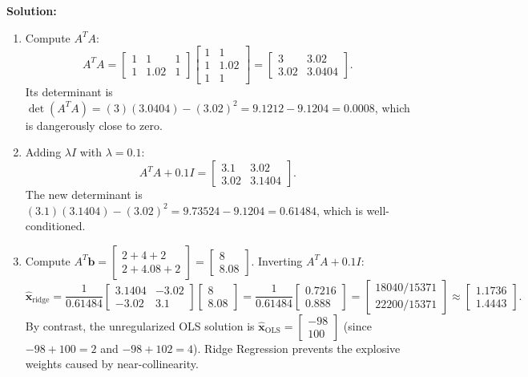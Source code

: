 \documentclass[11pt, letterpaper]{article}
\theoremstyle{definition}
\theoremstyle{remark}
\begin{document}
\textbf{Solution:}
\begin{enumerate}[label=(\alph*)]
    \item Compute $A^T A$:
    \[
    A^T A = \begin{bmatrix} 1 & 1 & 1 \\ 1 & 1.02 & 1 \end{bmatrix} \begin{bmatrix} 1 & 1 \\ 1 & 1.02 \\ 1 & 1 \end{bmatrix} = \begin{bmatrix} 3 & 3.02 \\ 3.02 & 3.0404 \end{bmatrix}.
    \]
    Its determinant is $\det(A^T A) = (3)(3.0404) - (3.02)^2 = 9.1212 - 9.1204 = 0.0008$, which is dangerously close to zero.
    \item Adding $\lambda I$ with $\lambda = 0.1$:
    \[
    A^T A + 0.1 I = \begin{bmatrix} 3.1 & 3.02 \\ 3.02 & 3.1404 \end{bmatrix}.
    \]
    The new determinant is $(3.1)(3.1404) - (3.02)^2 = 9.73524 - 9.1204 = 0.61484$, which is well-conditioned.
    \item Compute $A^T \mathbf{b} = \begin{bmatrix} 2+4+2 \\ 2+4.08+2 \end{bmatrix} = \begin{bmatrix} 8 \\ 8.08 \end{bmatrix}$. Inverting $A^T A + 0.1I$:
    \[
    \hat{\mathbf{x}}_{\text{ridge}} = \frac{1}{0.61484} \begin{bmatrix} 3.1404 & -3.02 \\ -3.02 & 3.1 \end{bmatrix} \begin{bmatrix} 8 \\ 8.08 \end{bmatrix} = \frac{1}{0.61484} \begin{bmatrix} 0.7216 \\ 0.888 \end{bmatrix} = \begin{bmatrix} 18040/15371 \\ 22200/15371 \end{bmatrix} \approx \begin{bmatrix} 1.1736 \\ 1.4443 \end{bmatrix}.
    \]
    By contrast, the unregularized OLS solution is $\hat{\mathbf{x}}_{\text{OLS}} = \begin{bmatrix} -98 \\ 100 \end{bmatrix}$ (since $-98 + 100 = 2$ and $-98 + 102 = 4$). Ridge Regression prevents the explosive weights caused by near-collinearity.
\end{enumerate}
\end{document}
